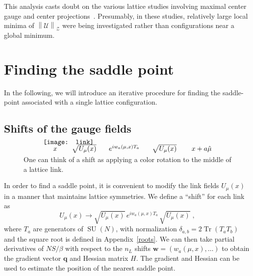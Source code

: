 \documentclass[preprint,aps,prd]{revtex4-2}
\newcommand{\be}{\begin{equation}}
\newcommand{\eq}{\end{equation}}
\newcommand{\zentrum}{\mathcal{Z}}       %
\newcommand{\config}{\mathcal{U}}
\DeclareMathOperator{\SU}{SU}
\DeclareMathOperator{\Tr}{Tr}
\begin{document}
This analysis casts doubt on the various lattice studies involving
maximal center gauge and center projections~\cite{
del_debbio_center_1997,del_debbio_detection_1998,de_forcrand_relevance_1999}.
Presumably, in these studies, relatively large local minima of
$\left\lVert \config \right\rVert_\zentrum$ were being investigated
rather than configurations near a global minimum.

\section{Finding the saddle point}

In the following, we will introduce an iterative procedure
for finding the saddle-point associated with a single
lattice configuration.

\subsection{Shifts of the gauge fields}

\begin{figure}
  \[
  \begin{array}{l}
    \mbox{} \hspace{0.2in} x \hspace{0.3in} \sqrt{U_\mu(x)}
    \hspace{0.25in} e^{i w_{a}(\mu, x) T_a}
    \hspace{0.25in} \sqrt{U_\mu(x)} \hspace{0.3in} x+a\hat{\mu} \\[-0.3in]
  \texttt{[image: link]}
  \end{array}
  \]
  \caption{One can think of a shift as applying a color rotation
    to the middle of a lattice link. \label{shift}}
\end{figure}

In order to find a saddle point, it is convenient to modify
the link fields $U_\mu(x)$ in a manner that maintains lattice symmetries.
We define a ``shift'' for each link as
\be
  U_\mu(x) \to \sqrt{U_\mu(x)}\, e^{i w_{a}(\mu, x) T_a}\, \sqrt{U_\mu(x)} \; ,
    \label{shifts}
\eq
where $T_a$ are generators of $\SU(N)$, with normalization
$\delta_{a,b} = 2 \Tr(T_a T_b)$ and the square root is defined
in Appendix~\ref{roots}.
We can then take partial derivatives of $N S/\beta$ with
respect to the $n_L$ shifts $\mathbf{w} = \left(w_a(\mu, x), \ldots\right)$
to obtain the gradient vector $\mathbf{q}$ and Hessian matrix
$H$.  The gradient and Hessian can be used to estimate the
position of the nearest saddle point.
\end{document}
